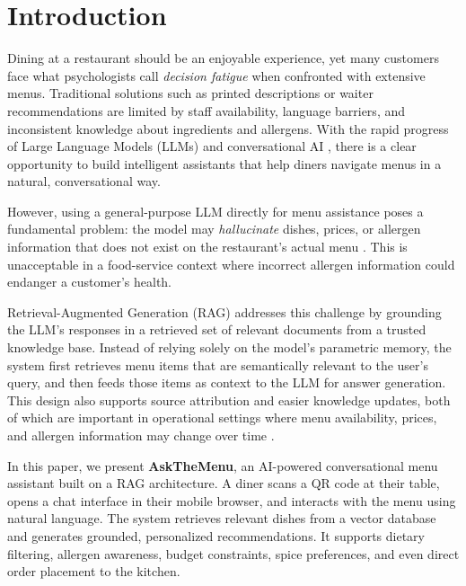 

\section{Introduction}\label{sec:intro}

Dining at a restaurant should be an enjoyable experience, yet many customers face what psychologists call \emph{decision fatigue} when confronted with extensive menus. Traditional solutions such as printed descriptions or waiter recommendations are limited by staff availability, language barriers, and inconsistent knowledge about ingredients and allergens. With the rapid progress of Large Language Models (LLMs) \cite{Brown2020GPT3, Touvron2023LLaMA} and conversational AI \cite{Ni2023ChatbotSurvey}, there is a clear opportunity to build intelligent assistants that help diners navigate menus in a natural, conversational way.

However, using a general-purpose LLM directly for menu assistance poses a fundamental problem: the model may \emph{hallucinate} dishes, prices, or allergen information that does not exist on the restaurant's actual menu \cite{Huang2023Hallucination}. This is unacceptable in a food-service context where incorrect allergen information could endanger a customer's health.

Retrieval-Augmented Generation (RAG) \cite{Lewis2020RAG,AWS2024RAG} addresses this challenge by grounding the LLM's responses in a retrieved set of relevant documents from a trusted knowledge base. Instead of relying solely on the model's parametric memory, the system first retrieves menu items that are semantically relevant to the user's query, and then feeds those items as context to the LLM for answer generation. This design also supports source attribution and easier knowledge updates, both of which are important in operational settings where menu availability, prices, and allergen information may change over time \cite{AWS2024RAG}.

In this paper, we present \textbf{AskTheMenu}, an AI-powered conversational menu assistant built on a RAG architecture. A diner scans a QR code at their table, opens a chat interface in their mobile browser, and interacts with the menu using natural language. The system retrieves relevant dishes from a vector database and generates grounded, personalized recommendations. It supports dietary filtering, allergen awareness, budget constraints, spice preferences, and even direct order placement to the kitchen.

